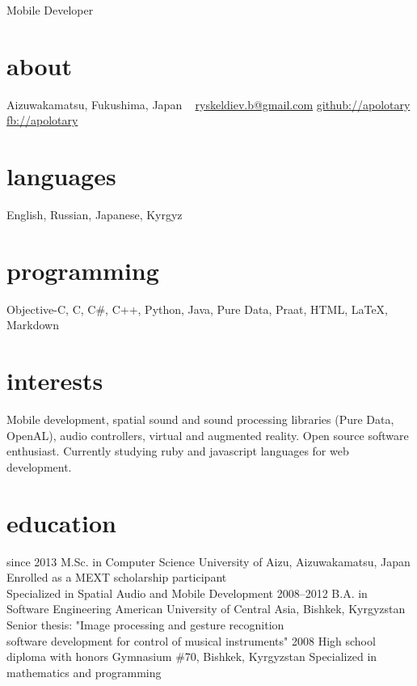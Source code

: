 \documentclass[]{friggeri-cv}
\begin{document}
       {Mobile Developer}

\begin{aside}
  \section{about}
    Aizuwakamatsu,
    Fukushima, Japan
    ~
    \href{mailto:ryskeldiev.b@gmail.com}{ryskeldiev.b@gmail.com}
    \href{https://github.com/Apolotary/}{github://apolotary}
    \href{http://facebook.com/apolotary}{fb://apolotary}
  \section{languages}
	English, Russian,
	Japanese, Kyrgyz
  \section{programming}
	Objective-C, C, C\#,
	C++, Python, Java,
	Pure Data, Praat,
	HTML, LaTeX,
	Markdown
 \end{aside}

\section{interests}

Mobile development, spatial sound and sound processing libraries (Pure Data, OpenAL), audio controllers, virtual and augmented reality. Open source software enthusiast. Currently studying ruby and javascript languages for web development.

\section{education}

\begin{entrylist}
  \entry
    {since 2013}
    {M.Sc. in Computer Science}
    {University of Aizu, Aizuwakamatsu, Japan}
    {Enrolled as a MEXT scholarship participant\\
    Specialized in Spatial Audio and Mobile Development}
  \entry
    {2008–2012}
    {B.A. in Software Engineering}
    {American University of Central Asia, Bishkek, Kyrgyzstan}
    {Senior thesis: "Image processing and gesture recognition\\
     software development for control of musical instruments"}
  \entry
    {2008}
    {High school diploma with honors}
    {Gymnasium \#70, Bishkek, Kyrgyzstan}
    {Specialized in mathematics and programming}
\end{entrylist}
\end{document}
